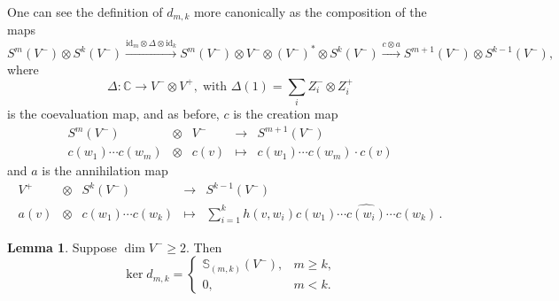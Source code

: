 \documentclass{amsart}[draft,11pt]
\numberwithin{equation}{section}
\theoremstyle{definition}
\newtheorem{lem}[theorem]{Lemma}
\begin{document}
One can see the definition of $d_{m,k}$ more canonically as the composition of the maps
\[
S^m(V^-)\otimes S^k(V^-)\xrightarrow{\text{id}_m\otimes \Delta\otimes\text{id}_k} S^m(V^-)\otimes V^-\otimes (V^-)^*\otimes S^k(V^-)\xrightarrow{c\otimes a}S^{m+1}(V^-)\otimes S^{k-1}(V^-),
\]
where 
$$\Delta \colon \mathbb C\to V^-\otimes V^+,\;\text{with }\Delta(1)=\sum_i Z_i^-\otimes Z_i^+$$ 
is the coevaluation map, and as before, $c$ is the creation map
$$
\begin{array}{rclcl}
     S^m(V^-)&\otimes& V^- & \longrightarrow  & S^{m+1}(V^-)\\
     c(w_1)\cdots c(w_m)&\otimes& c(v)& \longmapsto &
     c(w_1)\cdots c(w_m)\cdot c(v)
\end{array}
$$ 
and $a$ is the annihilation map
$$
\begin{array}{rclcl}
    V^+&\otimes& S^k(V^-)& \longrightarrow  & S^{k-1}(V^-)\\
    a(v) &\otimes & c(w_1)\cdots c(w_k)& \longmapsto & \sum_{i=1}^k h(v,w_i) c(w_1)\dotsb \widehat{c(w_i)}\dotsb c(w_k)\,.
\end{array} 
$$ 


\begin{lem} Suppose $\dim V^-\ge 2$. Then
\[\ker d_{m,k}=\begin{cases} \mathbb S_{(m,k)}(V^-),& m\ge k,\\ 0,&m<k.
\end{cases}
\]
\end{lem}
\end{document}

